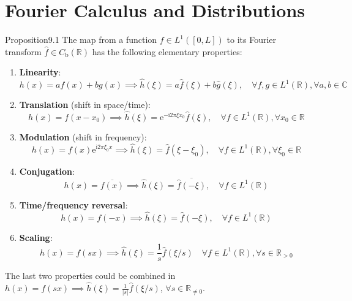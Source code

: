 \section{Fourier Calculus and Distributions}

\begin{res}{Proposition}{9.1}
The map from a function $f\in L^1([0,L])$ to its Fourier transform $\widehat f\in C_{\mathrm b}(\mathbb R)$ has the following elementary properties:
\begin{enumerate}
\item \textbf{Linearity}:
\begin{equation}h(x)=af(x)+bg(x)\implies\widehat h(\xi)=a\widehat f(\xi)+b\widehat g(\xi),\quad\forall f,g\in L^1(\mathbb R),\forall a,b\in\mathbb C\tag{9.9}\end{equation}
\item \textbf{Translation} (shift in space/time):
\begin{equation}h(x)=f(x-x_0)\implies\widehat h(\xi)=\mathrm e^{-\mathrm i2\pi\xi x_0}\widehat f(\xi),\quad\forall f\in L^1(\mathbb R),\forall x_0\in\mathbb R\tag{9.10}\end{equation}
\item \textbf{Modulation} (shift in frequency):
\begin{equation}h(x)=f(x)\mathrm e^{\mathrm i2\pi\xi_0x}\implies\widehat h(\xi)=\widehat f(\xi-\xi_0),\quad\forall f\in L^1(\mathbb R),\forall\xi_0\in\mathbb R\tag{9.11}\end{equation}
\item \textbf{Conjugation}:
\begin{equation}h(x)=\overline{f(x)}\implies\widehat h(\xi)=\overline{\widehat f(-\xi)},\quad\forall f\in L^1(\mathbb R)\tag{9.12}\end{equation}
\item \textbf{Time/frequency reversal}:
\begin{equation}h(x)=f(-x)\implies\widehat h(\xi)=\widehat f(-\xi),\quad\forall f\in L^1(\mathbb R)\tag{9.13}\end{equation}
\item \textbf{Scaling}:
\begin{equation}h(x)=f(sx)\implies\widehat h(\xi)=\frac1s\widehat f(\xi/s)\quad\forall f\in L^1(\mathbb R),\forall s\in\mathbb R_{>0}\tag{9.14}\end{equation}
\end{enumerate}
The last two properties could be combined in $h(x)=f(sx)\implies\widehat h(\xi)=\frac1{|s|}\widehat f(\xi/s)$, $\forall s\in\mathbb R_{\ne0}$.
\end{res}

